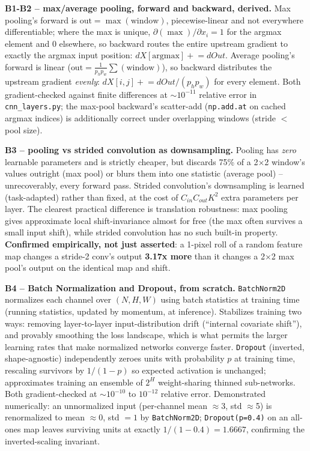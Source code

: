 \documentclass[11pt,a4paper]{article}
\begin{document}
\textbf{B1-B2 -- max/average pooling, forward and backward, derived.} Max pooling's forward is
$\text{out}=\max(\text{window})$, piecewise-linear and not everywhere differentiable; where the
max is unique, $\partial(\max)/\partial x_i = 1$ for the argmax element and $0$ elsewhere, so
backward routes the entire upstream gradient to exactly the argmax input position:
$dX[\text{argmax}] \mathrel{+}= dOut$. Average pooling's forward is linear
($\text{out}=\frac{1}{p_hp_w}\sum(\text{window})$), so backward distributes the upstream gradient
\emph{evenly}: $dX[i,j]\mathrel{+}=dOut/(p_hp_w)$ for every element. Both gradient-checked against
finite differences at $\sim 10^{-11}$ relative error in \texttt{cnn\_layers.py}; the max-pool
backward's scatter-add (\texttt{np.add.at} on cached argmax indices) is additionally correct under
overlapping windows (stride $<$ pool size).

\textbf{B3 -- pooling vs strided convolution as downsampling.} Pooling has \emph{zero} learnable
parameters and is strictly cheaper, but discards 75\% of a 2$\times$2 window's values outright
(max pool) or blurs them into one statistic (average pool) -- unrecoverably, every forward pass.
Strided convolution's downsampling is learned (task-adapted) rather than fixed, at the cost of
$C_{in}C_{out}K^2$ extra parameters per layer. The clearest practical difference is translation
robustness: max pooling gives approximate local shift-invariance almost for free (the max often
survives a small input shift), while strided convolution has no such built-in property.
\textbf{Confirmed empirically, not just asserted}: a 1-pixel roll of a random feature map changes
a stride-2 conv's output \textbf{3.17x more} than it changes a 2$\times$2 max pool's output on
the identical map and shift.

\textbf{B4 -- Batch Normalization and Dropout, from scratch.} \texttt{BatchNorm2D} normalizes each
channel over $(N,H,W)$ using batch statistics at training time (running statistics, updated by
momentum, at inference). Stabilizes training two ways: removing layer-to-layer input-distribution
drift (``internal covariate shift''), and provably smoothing the loss landscape, which is what
permits the larger learning rates that make normalized networks converge faster. \texttt{Dropout}
(inverted, shape-agnostic) independently zeroes units with probability $p$ at training time,
rescaling survivors by $1/(1-p)$ so expected activation is unchanged; approximates training an
ensemble of $2^H$ weight-sharing thinned sub-networks. Both gradient-checked at $\sim10^{-10}$ to
$10^{-12}$ relative error. Demonstrated numerically: an unnormalized input (per-channel mean
$\approx$3, std $\approx$5) is renormalized to mean $\approx$0, std $=1$ by \texttt{BatchNorm2D};
\texttt{Dropout(p=0.4)} on an all-ones map leaves surviving units at exactly $1/(1-0.4)=1.6667$,
confirming the inverted-scaling invariant.
\end{document}
